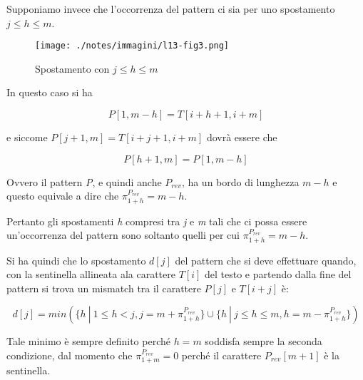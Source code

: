 Supponiamo invece che l'occorrenza del pattern ci sia per uno spostamento $ j \leq h \leq m $.

\begin{figure}[htbp]
	\centering
	\texttt{[image: ./notes/immagini/l13-fig3.png]}
	\caption{Spostamento con $ j \leq h \leq m $}
\end{figure}

In questo caso si ha 

$$
P[1,m-h] = T[i+h +1, i+m]
$$

e siccome $ P[j+1,m] = T[i+j+1,i+m] $ dovrà essere che

$$
P[h+1,m] = P[1,m-h]
$$

Ovvero il pattern \textit{P}, e quindi anche $ P_{rev} $, ha un bordo di lunghezza $ m-h $ e questo equivale a dire che $ \pi_{1+h}^{P_{rev}} = m-h $.

Pertanto gli spostamenti \textit{h} compresi tra \textit{j} e \textit{m} tali che ci possa essere un'occorrenza del pattern sono soltanto quelli per cui $ \pi_{1+h}^{P_{rev}}  = m-h $.

Si ha quindi che lo spostamento $d[j]$ del pattern che si deve effettuare quando, con la sentinella allineata ala carattere $ T[i] $ del testo e partendo dalla fine del pattern si trova un mismatch tra il carattere $ P[j] $ e $ T[i+j] $ è:

$$
d[j] = min(\{h \:|\: 1 \leq h < j, j = m + \pi_{1+h}^{P_{rev}}\} \cup \{h \:|\: j \leq h \leq m, h = m - \pi_{1+h}^{P_{rev}}\})
$$

Tale minimo è sempre definito perché $h = m$ soddisfa sempre la seconda condizione, dal momento che $ \pi_{1+m}^{P_{rev}}  = 0$ perché il carattere $ P_{rev}[m+1] $ è la sentinella.
